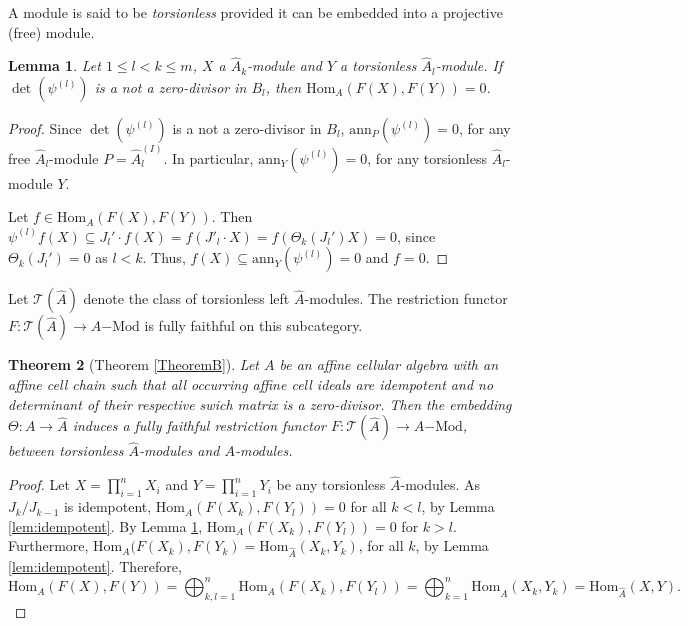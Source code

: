 \documentclass[oneside, a4paper, 11pt]{amsart}
\newtheorem{theorem}{Theorem}
\newtheorem{lemma}[theorem]{Lemma}
\newcommand{\asym}{\widehat{A}}
\newcommand{\cT}{\mathcal{T}}
\newcommand{\Hom}{\mathrm{Hom}}
\newcommand{\Ann}{\mathrm{ann}}
\begin{document}
A module is said to be {\em torsionless} provided it can be embedded into a projective (free) module. 

\begin{lemma}\label{lem:torsionless} Let  $1\leq l < k \leq m$,  $X$ a  $\asym_k$-module and $Y$ a torsionless $\asym_l$-module.  If $\det(\psi^{(l)})$ is a not a zero-divisor in $B_l$, then  $\Hom_A(F(X),F(Y))=0$. \end{lemma}

\begin{proof}
Since $\det(\psi^{(l)})$ is a not a zero-divisor in $B_l$, $\Ann_{P}(\psi^{(l)})=0$, for any free $\asym_l$-module $P=\asym_l^{(I)}$. In particular, 
$\Ann_{Y}(\psi^{(l)})=0$, for any torsionless $\asym_l$-module $Y$.

Let $f\in \Hom_A(F(X),F(Y))$. Then $\psi^{(l)} f(X) \subseteq  J_l' \cdot f(X) = f(J'_l\cdot X) = f(\Theta_k(J_l')X) = 0$, since  $\Theta_k(J_l')=0$ as $l<k$.  Thus, $f(X)\subseteq \Ann_Y(\psi^{(l)})=0$ and $f=0$.
\end{proof}


Let $\cT(\asym)$ denote the class of torsionless left $\asym$-modules. The restriction
functor $F:\cT(\asym) \to A\mathrm{-Mod}$ is fully faithful on this subcategory.

\begin{theorem}[Theorem \ref{TheoremB}] \label{TheoremBtext}
  Let $A$ be an affine cellular algebra with an affine cell chain such that
  all occurring affine cell ideals are idempotent and no determinant of their
  respective swich matrix is a zero-divisor.
  Then the embedding
  $\Theta: A \to \asym$ induces a fully faithful restriction functor
  $F: \cT(\asym) \to A\mathrm{-Mod}$, between torsionless $\asym$-modules and
  $A$-modules.
\end{theorem} 
\begin{proof}
  Let $X=\prod_{i=1}^n X_i$ and $Y=\prod_{i=1}^n Y_i$ be any torsionless
  $\asym$-modules. 
  As  $J_k/J_{k-1}$ is idempotent, $\Hom_A(F(X_k),F(Y_l)) = 0$ for
  all $k<l$, by Lemma \ref{lem:idempotent}.
By Lemma \ref{lem:torsionless}, $\Hom_A(F(X_k),F(Y_l)) = 0$ for $k>l$. Furthermore, $\Hom_A(F(X_k),F(Y_k) = \Hom_{\asym}(X_k,Y_k)$, for all $k$, by Lemma \ref{lem:idempotent}. Therefore,
$$\Hom_A(F(X),F(Y)) = \bigoplus_{k,l=1}^n \Hom_A(F(X_k),F(Y_l)) = \bigoplus_{k=1}^n \Hom_{\asym}(X_k,Y_k) = \Hom_{\asym}(X,Y).$$
\end{proof}




\end{document}
